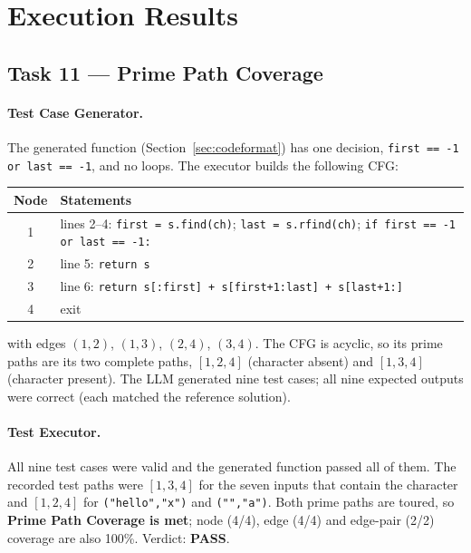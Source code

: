\documentclass[12pt, a4paper]{article}
\begin{document}
\section{Execution Results}
\label{sec:results}

\subsection{Task 11 --- Prime Path Coverage}

\paragraph{Test Case Generator.} The generated function (Section~\ref{sec:codeformat}) has one decision, \texttt{first == -1 or last == -1}, and no loops. The executor builds the following CFG:
\begin{center}
\begin{tabular}{cp{12cm}}
    \toprule
    \textbf{Node} & \textbf{Statements} \\
    \midrule
    1 & lines 2--4: \texttt{first = s.find(ch)}; \texttt{last = s.rfind(ch)}; \texttt{if first == -1 or last == -1:} \\
    2 & line 5: \texttt{return s} \\
    3 & line 6: \texttt{return s[:first] + s[first+1:last] + s[last+1:]} \\
    4 & exit \\
    \bottomrule
\end{tabular}
\end{center}
with edges $(1,2)$, $(1,3)$, $(2,4)$, $(3,4)$. The CFG is acyclic, so its prime paths are its two complete paths, $[1,2,4]$ (character absent) and $[1,3,4]$ (character present). The LLM generated nine test cases; all nine expected outputs were correct (each matched the reference solution).

\paragraph{Test Executor.} All nine test cases were valid and the generated function passed all of them. The recorded test paths were $[1,3,4]$ for the seven inputs that contain the character and $[1,2,4]$ for \texttt{("hello","x")} and \texttt{("","a")}. Both prime paths are toured, so \textbf{Prime Path Coverage is met}; node (4/4), edge (4/4) and edge-pair (2/2) coverage are also 100\%. Verdict: \textbf{PASS}.
\end{document}
